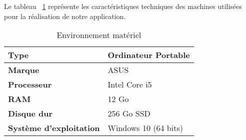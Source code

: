 \begin{justify}
    Le tableau ~\ref{tab:environementMateriel} représente les caractéristiques techniques des machines utilisées pour la réalisation de notre application.
    \vspace{-0.5cm}
    \begin{table}[H]
        \begin{center}
        \renewcommand{\arraystretch}{1.5}
        \caption{Environnement matériel}
    	\begin{tabular}{|p{6cm}|p{8cm}|} 		
        	\hline				
        	\textbf{Type} & Ordinateur Portable\\\hline
            \textbf{Marque} & ASUS \\\hline
            \textbf{Processeur}  & Intel Core i5\\\hline
            \textbf{RAM} & 12 Go  \\ \hline
            \textbf{Disque dur} & 256 Go SSD\\\hline
            \textbf{Système d’exploitation}  & Windows 10 (64 bits)\\\hline
	      \end{tabular}
            \label{tab:environementMateriel}
        \end{center}
    \end{table}
\end{justify}